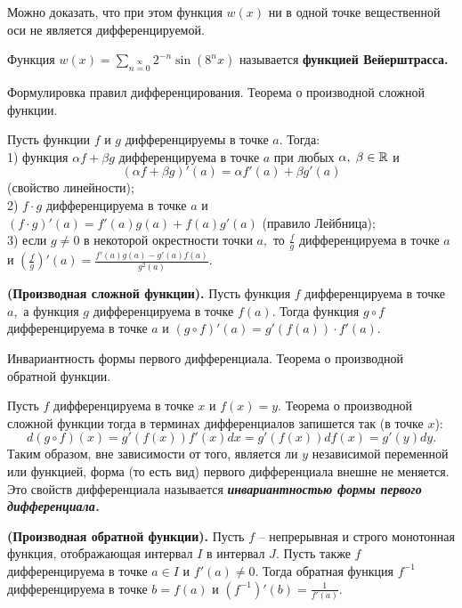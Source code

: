 Можно доказать, что при этом функция $w(x)$
ни в одной точке вещественной оси не является
дифференцируемой.

Функция $w(x)=\sum\limits_{n=0}\limits^{\infty}
    2^{-n}\sin(8^nx)$ называется
\textbf{функцией Вейерштрасса.}

\newpage

\begin{problem}
Формулировка правил дифференцирования. Теорема о производной сложной функции.
\end{problem}
\begin{proposition}
    Пусть функции $f$ и $g$ дифференцируемы
    в точке $a.$ Тогда:\\
    1) функция $\alpha f+\beta g$ дифференцируема
    в точке $a$ при любых $\alpha,\;\beta\in \mathbb{R}$
    и $$(\alpha f+\beta g)'(a)=
        \alpha f'(a)+\beta g'(a)$$
    (свойство линейности);\\
    2) $f\cdot g$ дифференцируема в точке $a$
    и $(f\cdot g)'(a)=f'(a)g(a)+f(a)g'(a)$
    (правило Лейбница); \\
    3) если $g\neq0$ в некоторой окрестности
    точки $a,$ то  $\frac{f}{g}$ дифференцируема
    в точке $a$ и $\left(\frac{f}{g}\right)'(a)=
        \frac{f'(a)g(a)-g'(a)f(a)}{g^2(a)}.$
\end{proposition}
\begin{proposition}
    \textbf{(Производная сложной функции).}
    Пусть функция $f$ дифференцируема в точке
    $a,$ а функция $g$ дифференцируема в точке
    $f(a).$ Тогда функция $g\circ f$ дифференцируема
    в точке $a$ и $(g\circ f)'(a)=g'(f(a))\cdot f'(a).$
\end{proposition}

\newpage

\begin{problem}
Инвариантность формы первого дифференциала. Теорема о производной обратной
функции.
\end{problem}
Пусть
$f$ дифференцируема в точке $x$
и $f(x)=y.$ Теорема
о производной сложной функции тогда
в терминах дифференциалов запишется
так (в точке $x$):
$$
    d(g\circ f)(x)=g'(f(x))f'(x)dx=
    g'(f(x))df(x)=g'(y)dy.
$$
Таким образом, вне зависимости от того, является
ли $y$ независимой переменной или функцией,
форма (то есть вид) первого дифференциала
внешне не меняется. Это свойств
дифференциала называется
\textbf{\emph{инвариантностью формы первого
        дифференциала.}}

\begin{proposition}
    \textbf{(Производная обратной функции).}
    Пусть $f$ -- непрерывная и строго монотонная функция,
    отображающая интервал $I$ в интервал $J.$ Пусть также
    $f$ дифференцируема в точке $a\in I$ и $f'(a)\neq0.$
    Тогда обратная функция $f^{-1}$ дифференцируема
    в точке $b=f(a)$ и $(f^{-1})'(b)=\frac{1}{f'(a)}.$
\end{proposition}

